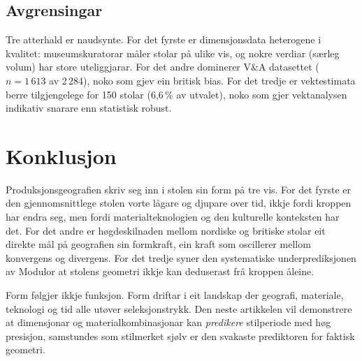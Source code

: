 \documentclass[10pt, a4paper, twocolumn]{article}
\begin{document}
\subsection{Avgrensingar}

Tre atterhald er naudsynte. For det fyrste er dimensjonsdata heterogene i kvalitet: museumskuratorar måler stolar på ulike vis, og nokre verdiar (særleg volum) har store uteliggjarar. For det andre dominerer V\&A datasettet ($n = 1\,613$ av 2\,284), noko som gjev ein britisk bias. For det tredje er vektestimata berre tilgjengelege for 150 stolar (6,6\,\% av utvalet), noko som gjer vektanalysen indikativ snarare enn statistisk robust.


\section{Konklusjon}

Produksjonsgeografien skriv seg inn i stolen sin form på tre vis. For det fyrste er den gjennomsnittlege stolen vorte lågare og djupare over tid, ikkje fordi kroppen har endra seg, men fordi materialteknologien og den kulturelle konteksten har det. For det andre er høgdeskilnaden mellom nordiske og britiske stolar eit direkte mål på geografien sin formkraft, ein kraft som oscillerer mellom konvergens og divergens. For det tredje syner den systematiske underprediksjonen av Modulor at stolens geometri ikkje kan deduserast frå kroppen åleine.

Form følgjer ikkje funksjon. Form driftar i eit landskap der geografi, materiale, teknologi og tid alle utøver seleksjonstrykk. Den neste artikkelen vil demonstrere at dimensjonar og materialkombinasjonar kan \emph{predikere} stilperiode med høg presisjon, samstundes som stilmerket sjølv er den svakaste prediktoren for faktisk geometri.




\end{document}
